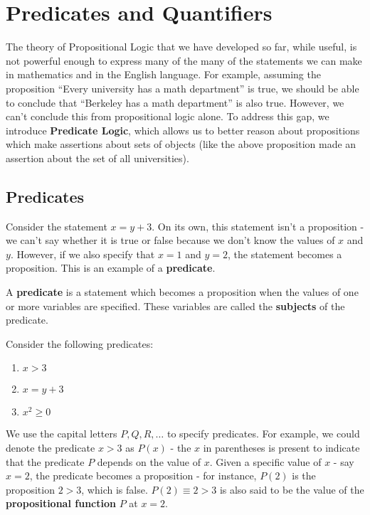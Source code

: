 \section{Predicates and Quantifiers}

The theory of Propositional Logic that we have developed so far, while useful, 
is not powerful enough to express many of the many of the statements we can 
make in mathematics and in the English language. For example, assuming the 
proposition ``Every university has a math department'' is true, we should 
be able to conclude that ``Berkeley has a math department'' is also true. 
However, we can't conclude this from propositional logic alone. 
To address this gap, we introduce \textbf{Predicate Logic}, which allows us 
to better reason about propositions which make assertions about sets of 
objects (like the above proposition made an assertion about the set of all 
universities).

\subsection{Predicates}

Consider the statement $x=y+3$. On its own, this statement isn't a proposition 
- we can't say whether it is true or false because we don't know the values 
of $x$ and $y$. However, if we also specify that $x=1$ and $y=2$, the 
statement becomes a proposition. This is an example of a \textbf{predicate}.

\begin{defn}
  A \textbf{predicate} is a statement which becomes a proposition when the values 
  of one or more variables are specified. These variables are called the 
  \textbf{subjects} of the predicate.
\end{defn}

\example Consider the following predicates:
\begin{enumerate}
  \item $x>3$
  \item $x=y+3$
  \item $x^2\geq 0$
\end{enumerate}

We use the capital letters $P,Q,R,\dots$ to specify predicates. For example, 
we could denote the predicate $x>3$ as $P(x)$ - the $x$ in parentheses is 
present to indicate that the predicate $P$ depends on the value of $x$. 
Given a specific value of $x$ - say $x=2$, the predicate becomes a proposition 
- for instance, $P(2)$ is the proposition $2>3$, which is false. 
$P(2)\equiv 2>3$ is also said to be the value of the 
\textbf{propositional function} $P$ at $x=2$.

